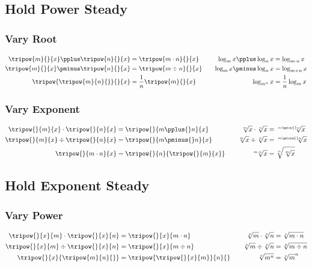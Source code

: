 
\subsection{Hold Power Steady}
\subsubsection{Vary Root}
\begin{align*}
\tripow{m}{}{x} \pplus \tripow{n}{}{x} &= \tripow{m\cdot{}n}{}{x} & \quad
	\log_m{x} \pplus \log_n{x} & = \log_{m\cdot{}n}{x} \\
\tripow{m}{}{x} \pminus \tripow{n}{}{x} &= \tripow{m \div n}{}{x} & \quad
	\log_m{x} \pminus \log_n{x} & = \log_{m \div n}{x} \\
\tripow{\tripow{m}{n}{}}{}{x} &= \frac{1}{n} \tripow{m}{}{x} & \quad
	\log_{m^n}{x} &= \frac{1}{n}\log_m{x}\\
\end{align*}


\subsubsection{Vary Exponent}
\begin{align*}
\tripow{}{m}{x} \cdot \tripow{}{n}{x} &= \tripow{}{m\pplus{}n}{x} & \quad
	\sqrt[m]{x} \cdot \sqrt[n]{x} &= \sqrt[m\pplus{}n]{x} \\
\tripow{}{m}{x} \div \tripow{}{n}{x} &= \tripow{}{m\pminus{}n}{x} & \quad
	\sqrt[m]{x} \div \sqrt[n]{x} &= \sqrt[m\pminus{}n]{x} \\
\tripow{}{m\cdot{}n}{x} &= \tripow{}{n}{\tripow{}{m}{x}} & \quad
	\sqrt[m\cdot{}n]{x} &= \sqrt[n]{\sqrt[m]{x}} \\
\end{align*}

\subsection{Hold Exponent Steady}
\subsubsection{Vary Power}
\begin{align*}
\tripow{}{x}{m} \cdot \tripow{}{x}{n} &= \tripow{}{x}{m\cdot{}n} & \quad
	\sqrt[x]{m} \cdot \sqrt[x]{n} &= \sqrt[x]{m\cdot{}n} \\
\tripow{}{x}{m} \div \tripow{}{x}{n} &= \tripow{}{x}{m\div{}n} & \quad
	\sqrt[x]{m} \div \sqrt[x]{n} &= \sqrt[x]{m\div{}n} \\
\tripow{}{x}{\tripow{m}{n}{}} & = \tripow{\tripow{}{x}{m}}{n}{} & \quad
	\sqrt[x]{m^n} &= \sqrt[x]{m}^n\\
\end{align*}

